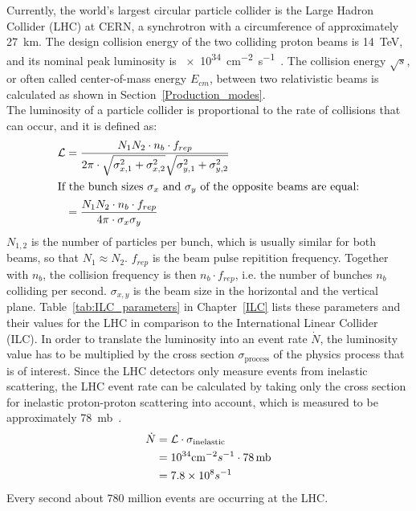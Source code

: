 Currently, the world's largest circular particle collider is the Large Hadron Collider (LHC) at CERN, a synchrotron with a circumference of approximately \SI{27}{\kilo\meter}.
The design collision energy of the two colliding proton beams is \SI{14}{\TeV}, and its nominal peak luminosity \lumi is \SI{e34}{\centi\meter^{-2}\second^{-1}}~\cite[p. 3]{LHC_Paper}.
The collision energy $\sqrt{s}$, or often called center-of-mass energy $E_{cm}$, between two relativistic beams is calculated as shown in Section~\ref{Production_modes}.
\\The luminosity of a particle collider is proportional to the rate of collisions that can occur, and it is defined as:
\begin{align}
 \mathcal{L}&=\frac{N_1N_2 \cdot n_b \cdot f_{rep}}{2\pi \cdot \sqrt{\sigma^2_{x,1}+\sigma^2_{x,2}} \sqrt{\sigma^2_{y,1}+\sigma^2_{y,2}}}\\
 \intertext{If the bunch sizes $\sigma_x$ and $\sigma_y$ of the opposite beams are equal:}
 &=\frac{N_1N_2 \cdot n_b \cdot f_{rep}}{4\pi \cdot \sigma_x \sigma_y}
 \label{eq:luminosity}
\end{align}
$N_{1,2}$ is the number of particles per bunch, which is usually similar for both beams, so that $N_1\approx N_2$.
$f_{rep}$ is the beam pulse repitition frequency.
Together with $n_b$, the collision frequency is then $n_{b}\cdot f_{rep}$, i.e. the number of bunches $n_{b}$ colliding per second.
$\sigma_{x,y}$ is the beam size in the horizontal and the vertical plane.
Table~\ref{tab:ILC_parameters} in Chapter~\ref{ILC} lists these parameters and their values for the LHC in comparison to the International Linear Collider (ILC).
In order to translate the luminosity into an event rate $\dot{N}$, the luminosity value has to be multiplied by the cross section $\sigma_{\mathrm{process}}$ of the physics process that is of interest.
Since the LHC detectors only measure events from inelastic scattering, the LHC event rate can be calculated by taking only the cross section for inelastic proton-proton scattering into account, which is measured to be approximately \SI{78}{\milli\barn}~\cite{inelXSection}.
\begin{align}
 \dot{N}&=\mathcal{L}\cdot\sigma_{\mathrm{inelastic}}\\
 &=10^{34} \textrm{cm}^{-2}s^{-1} \cdot 78\textrm{\,mb}\\
 &=7.8\times 10^8 s^{-1}
\end{align}
Every second about 780 million events are occurring at the LHC.
